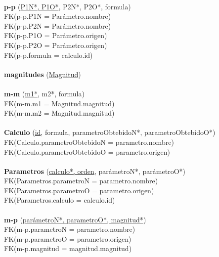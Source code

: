 \documentclass[a4paper,10pt]{article}
\newcommand\tab[1][1cm]{\hspace*{#1}}
\begin{document}
\paragraph{}
{\bf p-p} (\underline{P1N*, P1O*}, P2N*, P2O*, formula)\\
\tab FK(p-p.P1N = Parámetro.nombre)\\
\tab FK(p-p.P2N = Parámetro.nombre)\\
\tab FK(p-p.P1O = Parámetro.origen)\\
\tab FK(p-p.P2O = Parámetro.origen)\\
\tab FK(p-p.formula = calculo.id)

\paragraph{}
{\bf magnitudes} (\underline{Magnitud})

\paragraph{}
{\bf m-m} (\underline{m1*}, m2*, formula)\\
\tab FK(m-m.m1 = Magnitud.magnitud)\\
\tab FK(m-m.m2 = Magnitud.magnitud)

\paragraph{}
{\bf Calculo} (\underline{id}, formula, parametroObtebidoN*, parametroObtebidoO*)\\
\tab FK(Calculo.parametroObtebidoN = parametro.nombre)\\
\tab FK(Calculo.parametroObtebidoO = parametro.origen)

\paragraph{}
{\bf Parametros} (\underline{calculo*, orden}, parámetroN*, parámetroO*)\\
\tab FK(Parametros.parametroN = parametro.nombre)\\
\tab FK(Parametros.parametroO = parametro.origen)\\
\tab FK(Parametros.calculo = calculo.id)

\paragraph{}
{\bf m-p} (\underline{parámetroN*, parametroO*, magnitud*})\\
\tab FK(m-p.parametroN = parametro.nombre)\\
\tab FK(m-p.parametroO = parametro.origen)\\
\tab FK(m-p.magnitud = magnitud.magnitud)
\end{document}
